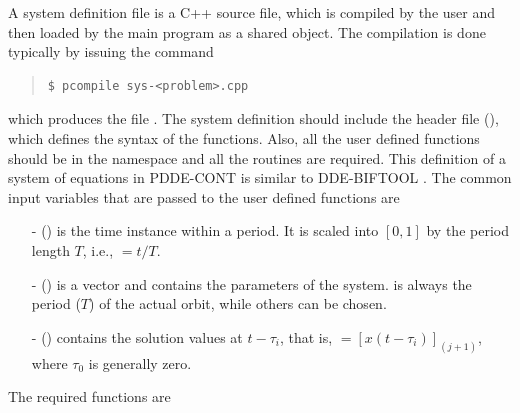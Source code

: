 \documentclass[10pt,a4paper]{ddedoc}
\begin{document}
A system definition file is a C++ source file, which is compiled by the user
and then loaded by the main program  as a shared object. The compilation is
done typically by issuing the command
{ \small \begin{quote} \begin{lstlisting}[basicstyle=\tt,frame=single]
$ pcompile sys-<problem>.cpp
\end{lstlisting} \end{quote} } \noindent
which produces the file .
The system definition should include the header file  (), which defines the syntax of the functions. Also, all the user defined functions should be in the  namespace and all the routines are required. This definition of a system of equations in PDDE-CONT is similar to DDE-BIFTOOL \cite{DDEBIF}. The common input variables that are passed to the user defined functions are
\begin{itemize}
  \item[-]  () is the time instance within a period. It is
  scaled into $[ 0, 1 ]$ by the period length $T$, i.e., $ = t/T$.
  \item[-]  () is a vector and contains the parameters of
  the system.  is always the period ($T$) of the actual orbit,
  while others can be chosen.
  \item[-]  () contains the solution values at $t -
  \tau_i$, that is, $= [ x ( t - \tau_i ) ]_(j+1)$, where $\tau_0$ is generally zero.
\end{itemize}
The required functions are
\end{document}
